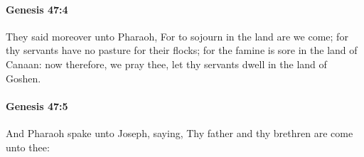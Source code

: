 		\paragraph{Genesis 47:4} %
			\label{GENESIS-47-4}

			They said moreover unto Pharaoh, For to sojourn in the land are we come; for thy servants have no pasture for their flocks; for the famine is sore in the land of Canaan: now therefore, we pray thee, let thy servants dwell in the land of Goshen.


		\paragraph{Genesis 47:5} %
			\label{GENESIS-47-5}

			And Pharaoh spake unto Joseph, saying, Thy father and thy brethren are come unto thee:


